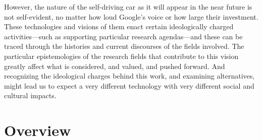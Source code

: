 

However, the nature of the self-driving car as it will appear in
the near future is not self-evident, no matter how loud Google's voice
or how large their investment. These technologies and visions of them
enact certain ideologically charged activities---such as supporting
particular research agendas---and these can be traced through the
histories and current discourses of the fields involved.
The particular epistemologies of the research fields that contribute
to this vision greatly affect what is considered, and valued, and
pushed forward. And recognizing the ideological charges behind this
work, and examining alternatives, might lead us to expect a very
different technology with very
different social and cultural impacts. 


\section{Overview}

